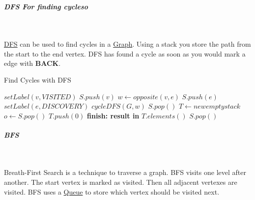 \documentclass[11pt,twoside,twocolumn,landscape]{article}
\begin{document}
\subparagraph{DFS For finding cycleso} \
\label{sec:org6da6181}

\href{../../../roam/20220202095038-dfs.org}{DFS} can be used to find cycles in a \href{../../../roam/20220201163000-graph.org}{Graph}.
Using a stack you store the path from the start to the end vertex.
DFS has found a cycle as soon as you would mark a edge with \textbf{BACK}.


\begin{algorithm}
  \caption{Find Cycles with DFS}
  \begin{algorithmic}
    \State $setLabel(v, VISITED)$
    \State $S.push(v)$
    \State $w \leftarrow opposite(v, e)$
    \State $S.push(e)$
    \State $setLabel(e, DISCOVERY)$
    \State $cycleDFS(G, w)$
    \State $S.pop()$
    \Else
    \State $T \leftarrow new empty stack$
    \Repeat
    \State $o \leftarrow S.pop()$
    \State $T.push(0)$
    \State \textbf{finish: result in} $T.elements()$
    \EndIf
    \EndIf
    \EndFor
    \State $S.pop()$
    \EndProcedure
  \end{algorithmic}
\end{algorithm}

\subparagraph{BFS} \
\label{sec:orgdbdc341}

Breath-First Search is a technique to traverse a graph.
BFS visits one level after another.
The start vertex is marked as visited.
Then all adjacent vertexes are visited.
BFS uses a \href{../../../roam/20210806221243-queue.org}{Queue} to store which vertex should be visited next.
\end{document}
